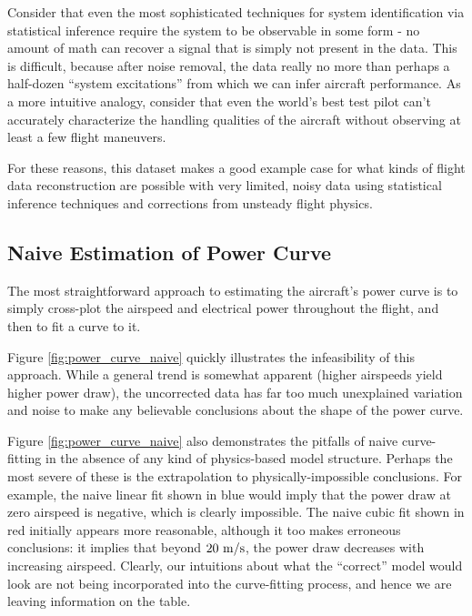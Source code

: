 \documentclass[conf]{new-aiaa}
\begin{document}
    Consider that even the most sophisticated techniques for system identification via statistical inference require the system to be observable in some form - no amount of math can recover a signal that is simply not present in the data. This is difficult, because after noise removal, the data really no more than perhaps a half-dozen ``system excitations'' from which we can infer aircraft performance. As a more intuitive analogy, consider that even the world's best test pilot can't accurately characterize the handling qualities of the aircraft without observing at least a few flight maneuvers.

    For these reasons, this dataset makes a good example case for what kinds of flight data reconstruction are possible with very limited, noisy data using statistical inference techniques and corrections from unsteady flight physics.

    \subsection{Naive Estimation of Power Curve}

    The most straightforward approach to estimating the aircraft's power curve is to simply cross-plot the airspeed and electrical power throughout the flight, and then to fit a curve to it.

    Figure \ref{fig:power_curve_naive} quickly illustrates the infeasibility of this approach. While a general trend is somewhat apparent (higher airspeeds yield higher power draw), the uncorrected data has far too much unexplained variation and noise to make any believable conclusions about the shape of the power curve.

    Figure \ref{fig:power_curve_naive} also demonstrates the pitfalls of naive curve-fitting in the absence of any kind of physics-based model structure. Perhaps the most severe of these is the extrapolation to physically-impossible conclusions. For example, the naive linear fit shown in blue would imply that the power draw at zero airspeed is negative, which is clearly impossible. The naive cubic fit shown in red initially appears more reasonable, although it too makes erroneous conclusions: it implies that beyond $20\ \rm m/s$, the power draw decreases with increasing airspeed. Clearly, our intuitions about what the ``correct'' model would look are not being incorporated into the curve-fitting process, and hence we are leaving information on the table.
\end{document}
